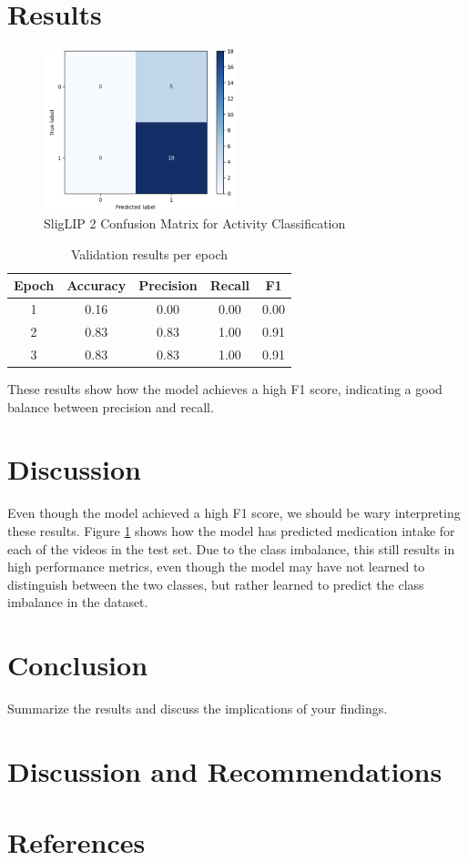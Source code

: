 \documentclass[a4paper,12pt]{article}
\begin{document}
\section{Results}
\begin{figure}[H]
    \centering
    \includegraphics[width=0.5\textwidth]{./images/test confusion matrix.png} %
    \caption{SligLIP 2 Confusion Matrix for Activity Classification}
    \label{fig:test-cm}
\end{figure}


\begin{table}[H]
    \centering
    \begin{tabular}{|c||c|c|c|c|}
        \hline
        Epoch & Accuracy & Precision & Recall & F1 \\
        \hline
        1 & 0.16 & 0.00 & 0.00 & 0.00 \\
        2 & 0.83 & 0.83 & 1.00 & 0.91 \\
        3 & 0.83 & 0.83 & 1.00 & 0.91 \\
        \hline
    \end{tabular}
    \caption{Validation results per epoch}
    \label{tab:val-results}
\end{table}


These results show how the model achieves a high F1 score, indicating a good balance between precision and recall. 

\section{Discussion}
Even though the model achieved a high F1 score, we should be wary interpreting these results. Figure \ref{fig:test-cm} shows
how the model has predicted medication intake for each of the videos in the test set. Due to the class imbalance, this 
still results in high performance metrics, even though the model may have not learned to distinguish between the two classes,
but rather learned to predict the class imbalance in the dataset. 

\section{Conclusion}
Summarize the results and discuss the implications of your findings.

\section{Discussion and Recommendations}

\section*{References}
\end{document}
